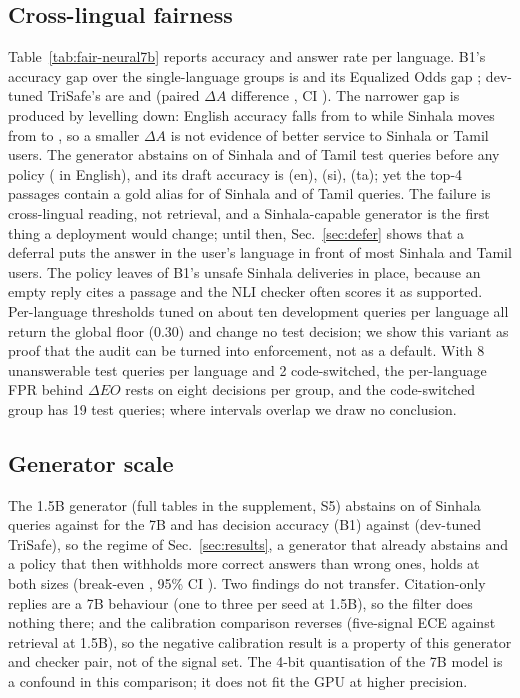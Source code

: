 \subsection{Cross-lingual fairness}\label{sec:fair}

Table~\ref{tab:fair-neural7b} reports accuracy and answer rate per language. B1's accuracy gap over the single-language groups is \LBoneGap{} and its Equalized Odds gap \LBoneEO; dev-tuned TriSafe's are \LTunGap{} and \LTunEO{} (paired $\Delta A$ difference \LTunDeltaGap, CI \LTunDeltaGapCI). The narrower gap is produced by levelling down: English accuracy falls from \LBoneAccen{} to \LTunAccen{} while Sinhala moves from \LBoneAccsi{} to \LTunAccsi, so a smaller $\Delta A$ is not evidence of better service to Sinhala or Tamil users. The generator abstains on \LModelAbstsi{} of Sinhala and \LModelAbstta{} of Tamil test queries before any policy (\LModelAbsten{} in English), and its draft accuracy is \LDraftAccen{} (en), \LDraftAccsi{} (si), \LDraftAccta{} (ta); yet the top-4 passages contain a gold alias for \LRetHitsi{} of Sinhala and \LRetHitta{} of Tamil queries. The failure is cross-lingual reading, not retrieval, and a Sinhala-capable generator is the first thing a deployment would change; until then, Sec.~\ref{sec:defer} shows that a deferral puts the answer in the user's language in front of most Sinhala and Tamil users. The policy leaves \LTunUnsafesi{} of B1's \LBoneUnsafesi{} unsafe Sinhala deliveries in place, because an empty reply cites a passage and the NLI checker often scores it as supported. Per-language thresholds tuned on about ten development queries per language all return the global floor (0.30) and change no test decision; we show this variant as proof that the audit can be turned into enforcement, not as a default. With 8 unanswerable test queries per language and 2 code-switched, the per-language FPR behind $\Delta EO$ rests on eight decisions per group, and the code-switched group has 19 test queries; where intervals overlap we draw no conclusion.

\subsection{Generator scale}\label{sec:scale}
The 1.5B generator (full tables in the supplement, S5) abstains on \NModelAbstsi{} of Sinhala queries against \LModelAbstsi{} for the 7B and has decision accuracy \NBoneDec{} (B1) against \NTunDec{} (dev-tuned TriSafe), so the regime of Sec.~\ref{sec:results}, a generator that already abstains and a policy that then withholds more correct answers than wrong ones, holds at both sizes (break-even \NTunBreakEven, 95\% CI \NTunBreakEvenCI). Two findings do not transfer. Citation-only replies are a 7B behaviour (one to three per seed at 1.5B), so the filter does nothing there; and the calibration comparison reverses (five-signal ECE \NTunEce{} against retrieval \NBoneEce{} at 1.5B), so the negative calibration result is a property of this generator and checker pair, not of the signal set. The 4-bit quantisation of the 7B model is a confound in this comparison; it does not fit the GPU at higher precision.

